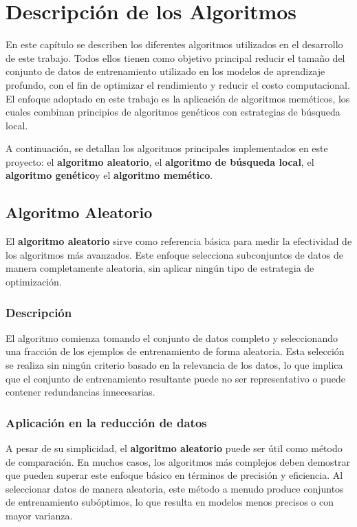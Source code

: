 
\chapter{Descripción de los Algoritmos}\label{ch:descripcion-algoritmos}
En este capítulo se describen los diferentes algoritmos utilizados en el desarrollo de este trabajo.
Todos ellos tienen como objetivo principal reducir el tamaño del conjunto de datos de entrenamiento utilizado en los
modelos de aprendizaje profundo, con el fin de optimizar el rendimiento y reducir el costo computacional.
El enfoque adoptado en este trabajo es la aplicación de algoritmos meméticos, los cuales combinan principios de
algoritmos genéticos con estrategias de búsqueda local.


A continuación, se detallan los algoritmos principales implementados en este proyecto: el \textbf{algoritmo aleatorio},
el \textbf{algoritmo de búsqueda local}, el \textbf{algoritmo genético}y el \textbf{algoritmo memético}.

\section{Algoritmo Aleatorio}\label{sec:algoritmo-aleatorio}
El \textbf{algoritmo aleatorio} sirve como referencia básica para medir la efectividad de los algoritmos más avanzados.
Este enfoque selecciona subconjuntos de datos de manera completamente aleatoria, sin aplicar ningún tipo de estrategia
de optimización.

\subsection{Descripción}\label{subsec:descripcion}
El algoritmo comienza tomando el conjunto de datos completo y seleccionando una fracción de los ejemplos de
entrenamiento de forma aleatoria.
Esta selección se realiza sin ningún criterio basado en la relevancia de los datos, lo que implica que el conjunto de
entrenamiento resultante puede no ser representativo o puede contener redundancias innecesarias.

\subsection{Aplicación en la reducción de datos}\label{subsec:aplicacion-en-la-reduccion-de-datos}
A pesar de su simplicidad, el \textbf{algoritmo aleatorio} puede ser útil como método de comparación.
En muchos casos, los algoritmos más complejos deben demostrar que pueden superar este enfoque básico en términos de
precisión y eficiencia.
Al seleccionar datos de manera aleatoria, este método a menudo produce conjuntos de entrenamiento subóptimos, lo que
resulta en modelos menos precisos o con mayor varianza.

